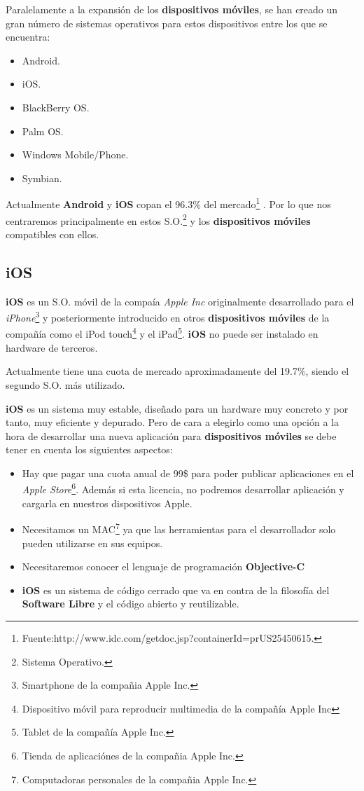 \bigskip
Paralelamente a la expansión de los \textbf{dispositivos móviles}, se han creado un gran número de sistemas operativos para estos dispositivos entre los que se encuentra:

\begin{itemize}
  \item Android.
  \item iOS.
  \item BlackBerry OS.
  \item Palm OS.
  \item Windows Mobile/Phone.
  \item Symbian.
\end{itemize}

\bigskip
Actualmente \textbf{Android} y \textbf{iOS} copan el 96.3\% del mercado\footnote{Fuente:http://www.idc.com/getdoc.jsp?containerId=prUS25450615.} . Por lo que nos centraremos principalmente en estos S.O.\footnote{Sistema Operativo.} y los \textbf{dispositivos móviles} compatibles con ellos.

\subsection{iOS}

\textbf{iOS} es un S.O. móvil de la compaía \textit{Apple Inc} originalmente desarrollado para el \textit{iPhone}\footnote{Smartphone de la compañia Apple Inc.} y posteriormente introducido en otros \textbf{dispositivos móviles} de la compañía como el iPod touch\footnote{Dispositivo móvil para reproducir multimedia de la compañía Apple Inc} y el iPad\footnote{Tablet de la compañía Apple Inc.}. \textbf{iOS} no puede ser instalado en hardware de terceros.

\bigskip
Actualmente tiene una cuota de mercado aproximadamente del 19.7\%, siendo el segundo S.O. más utilizado.

\bigskip
\textbf{iOS} es un sistema muy estable, diseñado para un hardware muy concreto y por tanto, muy eficiente y depurado. Pero de cara a elegirlo como una opción a la hora de desarrollar una nueva aplicación para \textbf{dispositivos móviles} se debe tener en cuenta los siguientes aspectos:

\begin{itemize}
  \item Hay que pagar una cuota anual de 99\$ para poder publicar aplicaciones en el \textit{Apple Store}\footnote{Tienda de aplicaciónes de la compañia Apple Inc.}. Además si esta licencia, no podremos desarrollar aplicación y cargarla en nuestros dispositivos Apple.
  \item Necesitamos un MAC\footnote{Computadoras personales de la compañia Apple Inc.} ya que las herramientas para el desarrollador solo pueden utilizarse en sus equipos.
  \item Necesitaremos conocer el lenguaje de programación \textbf{Objective-C}
  \item \textbf{iOS} es un sistema de código cerrado que va en contra de la filosofía del \textbf{Software Libre} y el código abierto y reutilizable.

\end{itemize}

